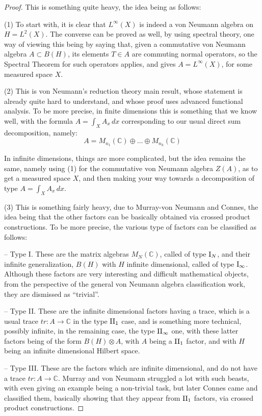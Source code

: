 \documentclass[12pt]{amsbook}
\begin{document}
\begin{proof}
This is something quite heavy, the idea being as follows:

\medskip

(1) To start with, it is clear that $L^\infty(X)$ is indeed a von Neumann algebra on $H=L^2(X)$. The converse can be proved as well, by using spectral theory, one way of viewing this being by saying that, given a commutative von Neumann algebra $A\subset B(H)$, its elements $T\in A$ are commuting normal operators, so the Spectral Theorem for such operators applies, and gives $A=L^\infty(X)$, for some measured space $X$.

\medskip

(2) This is von Neumann's reduction theory main result, whose statement is already quite hard to understand, and whose proof uses advanced functional analysis. To be more precise, in finite dimensions this is something that we know well, with the formula $A=\int_XA_x\,dx$ corresponding to our usual direct sum decomposition, namely:
$$A=M_{n_1}(\mathbb C)\oplus\ldots\oplus M_{n_k}(\mathbb C)$$

In infinite dimensions, things are more complicated, but the idea remains the same, namely using (1) for the commutative von Neumann algebra $Z(A)$, as to get a measured space $X$, and then making your way towards a decomposition of type $A=\int_XA_x\,dx$.

\medskip

(3) This is something fairly heavy, due to Murray-von Neumann and Connes, the idea being that the other factors can be basically obtained via crossed product constructions. To be more precise, the various type of factors can be classified as follows:

\medskip

-- Type I. These are the matrix algebras $M_N(\mathbb C)$, called of type ${\rm I}_N$, and their infinite generalization, $B(H)$ with $H$ infinite dimensional, called of type ${\rm I}_\infty$. Although these factors are very interesting and difficult mathematical objects, from the perspective of the general von Neumann algebra classification work, they are dismissed as ``trivial''.

\medskip

-- Type II. These are the infinite dimensional factors having a trace, which is a usual trace $tr:A\to\mathbb C$ in the type ${\rm II}_1$ case, and is something more technical, possibly infinite, in the remaining case, the type ${\rm II}_\infty$ one, with these latter factors being of the form $B(H)\otimes A$, with $A$ being a ${\rm II}_1$ factor, and with $H$ being an infinite dimensional Hilbert space.

\medskip

-- Type III. These are the factors which are infinite dimensional, and do not have a trace $tr:A\to\mathbb C$. Murray and von Neumann struggled a lot with such beasts, with even giving an example being a non-trivial task, but later Connes came and classified them, basically showing that they appear from ${\rm II}_1$ factors, via crossed product constructions.
\end{proof}
\end{document}
